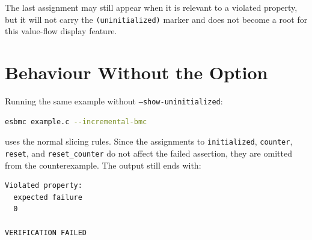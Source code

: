 \documentclass[11pt]{article}
\begin{document}
The last assignment may still appear when it is relevant to a violated
property, but it will not carry the \texttt{(uninitialized)} marker and does
not become a root for this value-flow display feature.

\section{Behaviour Without the Option}

Running the same example without \texttt{--show-uninitialized}:

\begin{lstlisting}[language=bash]
esbmc example.c --incremental-bmc
\end{lstlisting}

uses the normal slicing rules.  Since the assignments to \texttt{initialized},
\texttt{counter}, \texttt{reset}, and \texttt{reset\_counter} do not affect the
failed assertion, they are omitted from the counterexample.  The output still
ends with:

\begin{lstlisting}
Violated property:
  expected failure
  0

VERIFICATION FAILED
\end{lstlisting}
\end{document}
